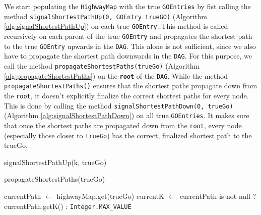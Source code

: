 \documentclass[12pt]{article}
\begin{document}
We start populating the \texttt{HighwayMap} with the true \texttt{GOEntries}
by fist calling the method \texttt{signalShortestPathUp(0, GOEntry trueGO)} (Algorithm \ref{alg:signalShortestPathUp}) on each true \texttt{GOEntry}.
This method is called recursively on each parent of the true \texttt{GOEntry} and
propagates the shortest path to the true \texttt{GOEntry} upwards in the \texttt{DAG}.
This alone is not sufficient, since we also have to propagate the shortest path
downwards in the \texttt{DAG}. 
For this purpose, we call the method \texttt{propagateShortestPaths(trueGo)} (Algorithm \ref{alg:propagateShortestPaths}) on the \texttt{\textbf{root}} 
of the \texttt{DAG}.
While the method \texttt{propagateShortestPaths()} ensures that the shortest paths propagate 
down from the \texttt{root}, it doesn't explicitly finalize the correct shortest 
paths for every node. This is done by calling the method \texttt{signalShortestPathDown(0, trueGo)} (Algorithm \ref{alg:signalShortestPathDown}) on all true \texttt{GOEntries}.
It makes sure that once the shortest paths are propagated down from the \texttt{root}, 
every node (especially those closer to \texttt{trueGo}) has the correct, 
finalized shortest path to the trueGo.

\begin{algorithm}[!htbp]
\caption{signalShortestPathUp(k, trueGo)}\label{alg:signalShortestPathUp}
\end{algorithm}


\begin{algorithm}[!htbp]
\caption{propagateShortestPaths(trueGo)}\label{alg:propagateShortestPaths}
currentPath $\gets$ highwayMap.get(trueGo) \;
currentK $\gets$ currentPath is not null ? currentPath.getK() : \texttt{Integer.MAX\_VALUE} \;
\end{algorithm}
\end{document}
